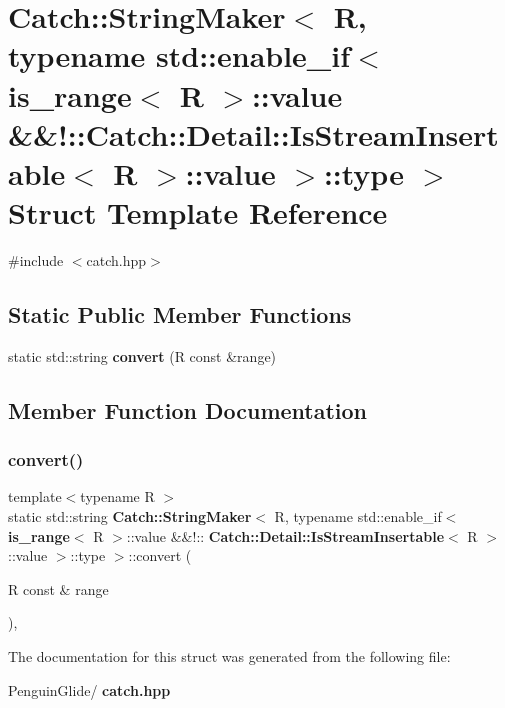 \section{Catch\+::String\+Maker$<$ R, typename std\+::enable\+\_\+if$<$ is\+\_\+range$<$ R $>$\+::value \&\&!\+::Catch\+::Detail\+::Is\+Stream\+Insertable$<$ R $>$\+::value $>$\+::type $>$ Struct Template Reference}
\label{struct_catch_1_1_string_maker_3_01_r_00_01typename_01std_1_1enable__if_3_01is__range_3_01_r_01_4536d8fedfff6d62432b3dc59b56e1380}


{\ttfamily \#include $<$catch.\+hpp$>$}

\subsection*{Static Public Member Functions}
\begin{DoxyCompactItemize}
\item 
static std\+::string \textbf{ convert} (R const \&range)
\end{DoxyCompactItemize}


\subsection{Member Function Documentation}
\mbox{\label{struct_catch_1_1_string_maker_3_01_r_00_01typename_01std_1_1enable__if_3_01is__range_3_01_r_01_4536d8fedfff6d62432b3dc59b56e1380_ac6088db00103a7482fb9bc04b1603362}} 
\subsubsection{convert()}
{\footnotesize\ttfamily template$<$typename R $>$ \\
static std\+::string \textbf{ Catch\+::\+String\+Maker}$<$ R, typename std\+::enable\+\_\+if$<$ \textbf{ is\+\_\+range}$<$ R $>$\+::value \&\&!\+::\textbf{ Catch\+::\+Detail\+::\+Is\+Stream\+Insertable}$<$ R $>$\+::value $>$\+::type $>$\+::convert (\begin{DoxyParamCaption}\item[{R const \&}]{range }\end{DoxyParamCaption})\hspace{0.3cm}{\ttfamily [inline]}, {\ttfamily [static]}}



The documentation for this struct was generated from the following file\+:\begin{DoxyCompactItemize}
\item 
Penguin\+Glide/\textbf{ catch.\+hpp}\end{DoxyCompactItemize}

